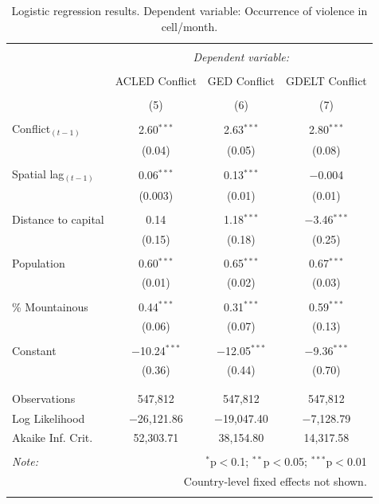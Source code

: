 \documentclass[hidelinks]{article}
\begin{document}
\newpage
\begin{table}[!htbp] \centering 
\begin{tabular}{@{\extracolsep{5pt}}lccc} 
\\[-1.8ex]\hline 
\hline \\[-1.8ex] 
 & \multicolumn{3}{c}{\textit{Dependent variable:}} \\ 
\cline{2-4} 
\\[-1.8ex] & ACLED Conflict & GED Conflict & GDELT Conflict \\ 
\\[-1.8ex] & (5) & (6) & (7)\\ 
\hline \\[-1.8ex] 
 Conflict$_{(t-1)}$ & 2.60$^{***}$ & 2.63$^{***}$ & 2.80$^{***}$ \\ 
  & (0.04) & (0.05)  & (0.08) \\ 
  & & & \\ 
 Spatial lag$_{(t-1)}$ & 0.06$^{***}$ & 0.13$^{***}$ & $-$0.004 \\ 
  & (0.003) & (0.01) & (0.01) \\ 
  & & & \\ 
 Distance to capital & 0.14 & 1.18$^{***}$ & $-$3.46$^{***}$ \\ 
  & (0.15) & (0.18) & (0.25) \\ 
  & & & \\ 
 Population & 0.60$^{***}$ & 0.65$^{***}$ & 0.67$^{***}$ \\ 
  & (0.01) & (0.02) & (0.03) \\ 
  & & & \\ 
 \% Mountainous & 0.44$^{***}$ & 0.31$^{***}$ & 0.59$^{***}$ \\ 
  & (0.06) & (0.07) & (0.13) \\ 
  & & & \\ 
 Constant & $-$10.24$^{***}$ & $-$12.05$^{***}$ & $-$9.36$^{***}$ \\ 
  & (0.36) & (0.44) & (0.70) \\ 
  & & & \\ 
\hline \\[-1.8ex] 
Observations & 547,812 & 547,812 & 547,812 \\ 
Log Likelihood & $-$26,121.86 & $-$19,047.40 & $-$7,128.79 \\ 
Akaike Inf. Crit. & 52,303.71 & 38,154.80 & 14,317.58 \\ 
\hline 
\hline \\[-1.8ex] 
\textit{Note:}  & \multicolumn{3}{r}{$^{*}$p$<$0.1; $^{**}$p$<$0.05; $^{***}$p$<$0.01} \\ 
			& \multicolumn{3}{r}{Country-level fixed effects not shown.} \\ 
\normalsize 
\end{tabular} 
  \caption{Logistic regression results. Dependent variable: Occurrence of violence in cell/month.} \label{tab:regression2} 

\end{table} 
\end{document}
